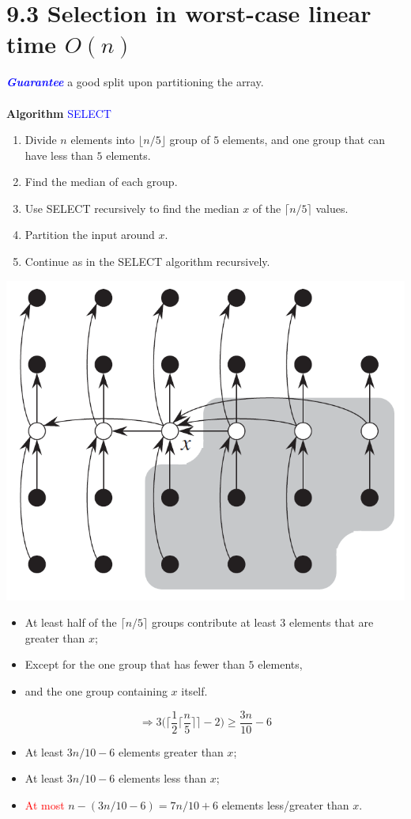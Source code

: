 \documentclass[a4paper]{article}
\begin{document}
\section*{9.3 Selection in worst-case linear time $O(n)$}
\textcolor{blue}{\textit{\textbf{Guarantee}}} a good split upon partitioning the array.\\
\\
\textbf{Algorithm} \textcolor{blue}{SELECT}
\begin{enumerate}
    \item Divide $n$ elements into $\lfloor n/5 \rfloor$ group of $5$ elements, and one group that can have less than $5$ elements.
    \item Find the median of each group.
    \item Use SELECT recursively to find the median $x$ of the $\lceil n/5 \rceil$ values.
    \item Partition the input around $x$.
    \item Continue as in the SELECT algorithm recursively.
\end{enumerate}
\includegraphics[scale=0.5]{"algorithm SELECT"}
\begin{itemize}
    \item At least half of the $\lceil n/5\rceil$ groups contribute at least $3$ elements that are greater than $x$;
    \item Except for the one group that has fewer than $5$ elements,
    \item and the one group containing $x$ itself.
\end{itemize}
\begin{equation*}
    \Rightarrow 3\Bigg(\bigg\lceil\frac{1}{2}\Big\lceil\frac{n}{5}\Big\rceil\bigg\rceil-2\Bigg)\geq \frac{3n}{10}-6
\end{equation*}
\begin{itemize}
    \item At least $3n/10-6$ elements greater than $x$;
    \item At least $3n/10-6$ elements less than $x$;
    \item \textcolor{red}{At most} $n-(3n/10-6)=7n/10+6$ elements less/greater than $x$.
\end{itemize}
\end{document}
